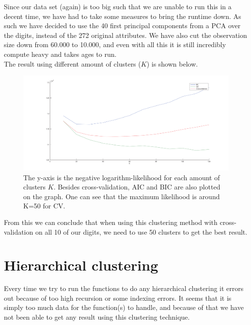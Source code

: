 Since our data set (again) is too big such that we are unable to run this in a decent time, we have had to take some measures to bring the runtime down. As such we have decided to use the 40 first principal components from a PCA over the digits, instead of the 272 original attributes. We have also cut the observation size down from 60.000 to 10.000, and even with all this it is still incredibly compute heavy and takes ages to run. \\

The result using different amount of clusters ($K$) is shown below.

\begin{figure}[H]
\centering
\includegraphics[width=1\linewidth]{code/pca_gmm10-120_cv}
\caption{The y-axis is the negative logarithm-likelihood for each amount of clusters $K$. Besides cross-validation, AIC and BIC are also plotted on the graph. One can see that the maximum likelihood is around K=50 for CV.}
\label{fig:pca_gmm10-120_cv}
\end{figure}


From this we can conclude that when using this clustering method with cross-validation on all 10 of our digits, we need to use 50 clusters to get the best result.


\section{Hierarchical clustering}

Every time we try to run the functions to do any hierarchical clustering it errors out because of too high recursion or some indexing errors. It seems that it is simply too much data for the function(s) to handle, and because of that we have not been able to get any result using this clustering technique.



